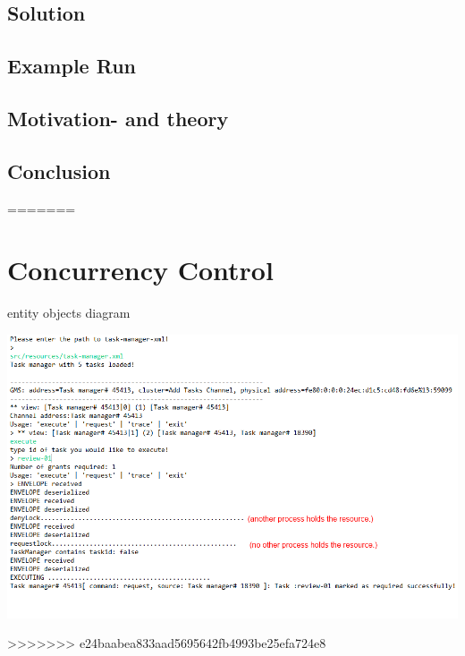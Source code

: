 \section{Solution}
\label{MutualExclusion_solution}

\section{Example Run}
\label{MutualExclusion_run}

\section{Motivation- and theory}
\label{MutualExclusion_motivation}

\section{Conclusion}
\label{MutualExclusion_conclusion}
=======
\chapter{Concurrency Control}



\begin{center}
\centering
\caption{entity objects diagram}
\includegraphics[scale=0.6]{images/Concurrency_run.png}
\end{center}
\vspace{10pt}
>>>>>>> e24baabea833aad5695642fb4993be25efa724e8
